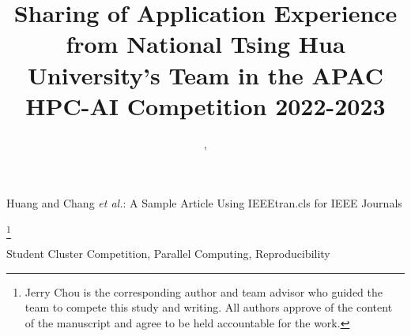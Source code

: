 \documentclass[lettersize,journal]{IEEEtran}
\newcommand\blfootnote[1]{%
  \begingroup
  \renewcommand\thefootnote{}\footnote{#1}%
  \addtocounter{footnote}{-1}%
  \endgroup
}
\begin{document}
\title{Sharing of Application Experience from National Tsing Hua University's Team in the APAC HPC-AI Competition 2022-2023}


\author{, 
}



%
{Huang and Chang \MakeLowercase{\textit{et al.}}: A Sample Article Using IEEEtran.cls for IEEE Journals}


\maketitle

\blfootnote{Jerry Chou is the corresponding author and team advisor who guided the team to compete this study and writing. All authors approve of the content of the manuscript and agree to be held accountable for the work.}





\begin{IEEEkeywords}
Student Cluster Competition, Parallel Computing, Reproducibility
\end{IEEEkeywords}












\end{document}
